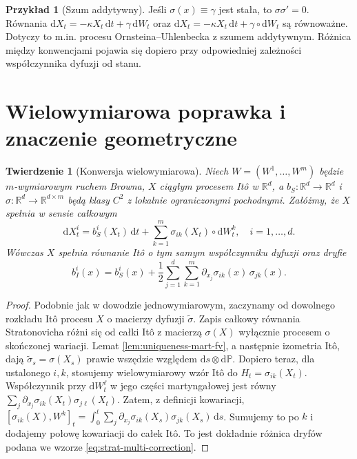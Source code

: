 \documentclass[11pt,a4paper,oneside]{report}
\numberwithin{equation}{chapter}
\theoremstyle{plain}
\newtheorem{twierdzenie}{Twierdzenie}[chapter]
\theoremstyle{definition}
\newtheorem{przyklad}{Przykład}[chapter]
\theoremstyle{remark}
\newcommand{\R}{\mathbb{R}}
\newcommand{\Prob}{\mathbb{P}}
\newcommand{\dd}{\mathrm{d}}
\begin{document}
\begin{przyklad}[Szum addytywny]
Jeśli $\sigma(x)\equiv\gamma$ jest stała, to
$\sigma\sigma'=0$. Równania
$\dd X_t=-\kappa X_t\,\dd t+\gamma\,\dd W_t$
oraz
$\dd X_t=-\kappa X_t\,\dd t+\gamma\circ\dd W_t$
są równoważne. Dotyczy to m.in. procesu
Ornsteina--Uhlenbecka z szumem addytywnym.
Różnica między konwencjami pojawia się dopiero przy
odpowiedniej zależności współczynnika dyfuzji od stanu.
\end{przyklad}

\section{Wielowymiarowa poprawka i znaczenie geometryczne}\label{sec:volIII:04:05}
\begin{twierdzenie}[Konwersja wielowymiarowa]\label{thm:volIII:04:05}
Niech $W=(W^1,\ldots,W^m)$ będzie $m$-wymiarowym
ruchem Browna, $X$ ciągłym procesem Itô w $\R^d$,
a $b_S:\R^d\to\R^d$ i
$\sigma:\R^d\to\R^{d\times m}$ będą klasy $C^2$
z lokalnie ograniczonymi pochodnymi.
Załóżmy, że $X$ spełnia w sensie całkowym
\[
\dd X_t^i=b_S^i(X_t)\,\dd t
+\sum_{k=1}^m\sigma_{ik}(X_t)\circ\dd W_t^k,
\quad i=1,\ldots,d.
\]
Wówczas $X$ spełnia równanie Itô o tym samym
współczynniku dyfuzji oraz dryfie
\[
b_I^i(x)=b_S^i(x)+\frac12\sum_{j=1}^d
\sum_{k=1}^m\partial_{x_j}\sigma_{ik}(x)\,
\sigma_{jk}(x).
\tag{4.10}\label{eq:strat-multi-correction}
\]
\end{twierdzenie}
\begin{proof}
Podobnie jak w dowodzie jednowymiarowym, zaczynamy
od dowolnego rozkładu Itô procesu $X$ o macierzy
dyfuzji $\widetilde\sigma$. Zapis całkowy równania
Stratonovicha różni się od całki Itô z macierzą
$\sigma(X)$ wyłącznie procesem o skończonej wariacji.
Lemat \ref{lem:uniqueness-mart-fv}, a następnie izometria
Itô, dają $\widetilde\sigma_s=\sigma(X_s)$ prawie
wszędzie względem $\dd s\otimes\dd\Prob$.
Dopiero teraz, dla ustalonego $i,k$, stosujemy
wielowymiarowy wzór Itô do $H_t=\sigma_{ik}(X_t)$.
Współczynnik przy $\dd W_t^\ell$ w jego części
martyngałowej jest równy
$\sum_j\partial_{x_j}\sigma_{ik}(X_t)\sigma_{j\ell}(X_t)$.
Zatem, z definicji kowariacji,
$[\sigma_{ik}(X),W^k]_t=
\int_0^t\sum_j\partial_{x_j}\sigma_{ik}(X_s)
\sigma_{jk}(X_s)\,\dd s$.
Sumujemy to po $k$ i dodajemy połowę kowariacji do
całek Itô. To jest dokładnie różnica dryfów podana
we wzorze \eqref{eq:strat-multi-correction}.
\end{proof}
\end{document}
